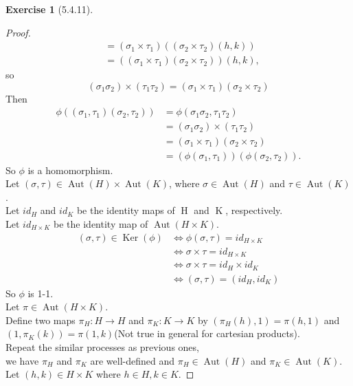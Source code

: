 \documentclass{amsart}
\renewcommand{\ker}{\operatorname{Ker}}
\theoremstyle{plain}
\theoremstyle{definition}
\newtheorem{exer}[lem]{Exercise}
\begin{document}
\begin{exer}[5.4.11]
\begin{proof}
\begin{align*}
	 												  &=(\sigma_1 \times \tau_1) \left((\sigma_2 \times \tau_2)(h,k)\right) \\
	 												  &=\left((\sigma_1 \times \tau_1) (\sigma_2 \times \tau_2)\right)(h,k), 
   \end{align*}
   so
   \[(\sigma_1\sigma_2)\times (\tau_1\tau_2) = (\sigma_1 \times \tau_1) (\sigma_2 \times \tau_2)\]
   Then
   \begin{align*}
   	 \phi\left((\sigma_1,\tau_1)(\sigma_2,\tau_2)\right) &= \phi (\sigma_1\sigma_2,\tau_1\tau_2)\\
   	 													 &=(\sigma_1\sigma_2) \times (\tau_1\tau_2) \\
   	 													 &=(\sigma_1 \times \tau_1) (\sigma_2 \times \tau_2) \\
   	 													 &=\left(\phi(\sigma_1,\tau_1)\right)\left(\phi(\sigma_2,\tau_2)\right).
   \end{align*}
   So $\phi$ is a homomorphism.\\
   Let $(\sigma,\tau) \in \operatorname{Aut}(H) \times \operatorname{Aut}(K)$, where $\sigma \in \operatorname{Aut}(H)$ and $\tau \in \operatorname{Aut}(K)$.\\
   Let $id_H$ and $id_K$ be the identity maps of $\operatorname{H}$ and $\operatorname{K}$, respectively.\\
   Let $id_{H\times K}$ be the identity map of $\operatorname{Aut}(H\times K)$.
   \begin{align*}
	 (\sigma,\tau) \in \ker(\phi) &\Leftrightarrow \phi(\sigma,\tau) = id_{H \times K} \\
	 							  &\Leftrightarrow \sigma\times \tau = id_{H \times K}\\
	 							  &\Leftrightarrow \sigma \times \tau = id_{H} \times id_{K} \\
	 							  &\Leftrightarrow (\sigma,\tau) = (id_{H},id_{K})
   \end{align*}
	So $\phi$ is 1-1.\\
	Let $\pi \in \operatorname{Aut}(H \times K)$.\\
	Define two maps $\pi_H:H\to H$ and $\pi_K: K\to K$ by $\left(\pi_H(h),1\right) = \pi(h,1)$ and $ \left(1,\pi_K(k)\right) = \pi(1,k)$(Not true in general for cartesian products).\\
	Repeat the similar processes as previous ones, \\
	we have $\pi_H$ and $\pi_K$ are well-defined and $\pi_H \in \operatorname{Aut}(H)$ and $\pi_K \in \operatorname{Aut}(K)$.\\
	Let $(h,k) \in H \times K$ where $h \in H, k \in K$.

\end{proof}
\end{exer}
\end{document}
